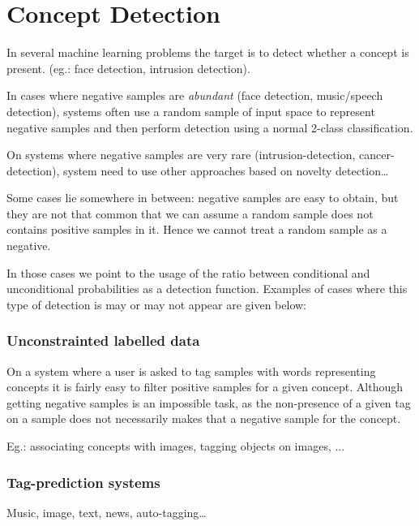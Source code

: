 \documentclass[a4paper]{article}
\begin{document}
\section{Concept Detection}
\label{sec:detection}


In several machine learning problems the target is to detect whether a concept is present.
(eg.: face detection, intrusion detection).

In cases where negative samples are \emph{abundant} (face detection, music/speech detection), systems often use a random sample of input space to represent negative samples and then perform detection using a normal 2-class classification.

On systems where negative samples are very rare (intrusion-detection, cancer-detection), system need to use other approaches based on novelty detection\dots

Some cases lie somewhere in between: negative samples are easy to obtain, but they are not that common that we can assume a random sample does not contains positive samples in it. Hence we cannot treat a random sample as a negative.

In those cases we point to the usage of the ratio between conditional and unconditional probabilities as a detection function.
Examples of cases where this type of detection is may or may not appear are given below:

\subsubsection*{Unconstrainted labelled data}
On a system where a user is asked to tag samples with words representing concepts it is fairly easy to filter positive samples for a given concept.
Although getting negative samples is an impossible task, as the non-presence of a given tag on a sample does not necessarily makes that a negative sample for the concept.

Eg.: associating concepts with images, tagging objects on images, ...

\subsubsection*{Tag-prediction systems}
Music, image, text, news, auto-tagging\dots
\end{document}

